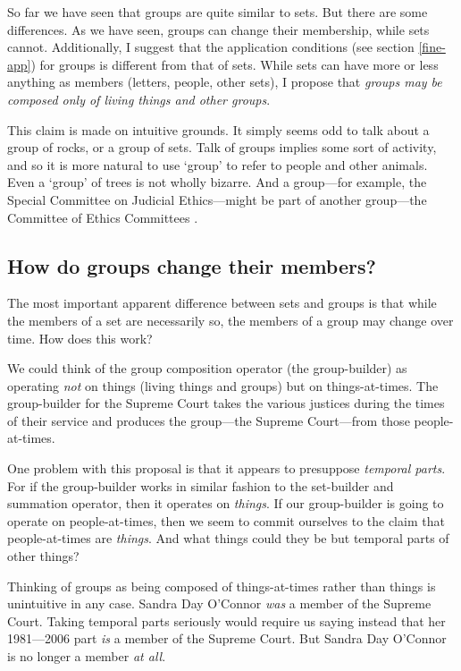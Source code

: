 \documentclass[11pt]{article}
\begin{document}
\begin{spacing}{1.5}
So far we have seen that groups are quite similar to sets.  But there
are some differences.  As we have seen, groups can change their
membership, while sets cannot.  Additionally, I suggest that the
application conditions (see section \ref{fine-app}) for groups is
different from that of sets.  While sets can have more or less
anything as members (letters, people, other sets), I propose that {\em
  groups may be composed only of living things and other groups}.

This claim is made on intuitive grounds.  It simply seems odd to talk
about a group of rocks, or a group of sets.  Talk of groups implies
some sort of activity, and so it is more natural to use `group' to
refer to people and other animals.  Even a `group' of trees is not
wholly bizarre.  And a group---for example, the Special Committee on
Judicial Ethics---might be part of another group---the Committee of
Ethics Committees \citep[145]{uzquiano2004a}.


\subsection{How do groups change their members?}
\label{group-time}
The most important apparent difference between sets and groups is that
while the members of a set are necessarily so, the members of a group
may change over time.  How does this work?

We could think of the group composition operator (the group-builder)
as operating {\em not} on things (living things and groups) but on
things-at-times.  The group-builder for the Supreme Court takes the
various justices during the times of their service and produces the
group---the Supreme Court---from those people-at-times.

One problem with this proposal is that it appears to presuppose {\em
  temporal parts}.  For if the group-builder works in similar fashion
to the set-builder and summation operator, then it operates on {\em
  things}.  If our group-builder is going to operate on
people-at-times, then we seem to commit ourselves to the claim that
people-at-times are {\em things}.  And what things could they be but
temporal parts of other things?

Thinking of groups as being composed of things-at-times rather than
things is unintuitive in any case.  Sandra Day O'Connor \emph{was} a
member of the Supreme Court.  Taking temporal parts seriously would
require us saying instead that her 1981---2006 part \emph{is} a member
of the Supreme Court.  But Sandra Day O'Connor is no longer a member
{\em at all}.


\end{spacing}
\end{document}
